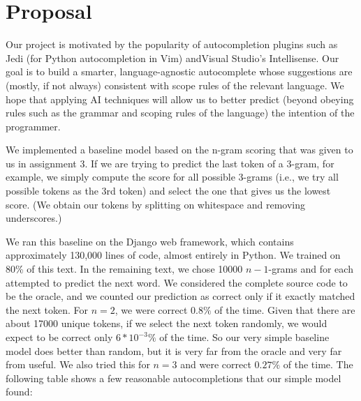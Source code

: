 \documentclass[10.75pt]{article}
\begin{document}
\maketitle

\section{Proposal}
Our project is motivated by the popularity of autocompletion plugins such as Jedi (for Python autocompletion in Vim)\cite{jedi} andVisual Studio's Intellisense. Our goal is to build a smarter, language-agnostic autocomplete whose suggestions are (mostly, if not always) consistent with scope rules of the relevant language. We hope that applying AI techniques will allow us to better predict (beyond obeying rules such as the grammar and scoping rules of the language) the intention of the programmer. 

We implemented a baseline model based on the n-gram scoring that was given to us in assignment 3. If we are trying to predict the last token of a 3-gram, for example, we simply compute the score for all possible 3-grams (i.e., we try all possible tokens as the 3rd token) and select the one that gives us the lowest score. (We obtain our tokens by splitting on whitespace and removing underscores.) 

We ran this baseline on the Django web framework, which contains approximately 130,000 lines of code, almost entirely in Python. We trained on 80\% of this text.  In the remaining text, we chose 10000 $n-1$-grams and for each attempted to predict the next word. We considered the complete source code to be the oracle, and we counted our prediction as correct only if it exactly matched the next token. For $n=2$, we were correct $0.8\%$ of the time.  Given that there are about 17000 unique tokens, if we select the next token randomly, we would expect to be correct only  $6*10^{-3}\%$ of the time. So our very simple baseline model does better than random, but it is very far from the oracle and very far from useful. We also tried this for $n=3$ and were correct $0.27\%$ of the time. The following table shows a few reasonable autocompletions that our simple model found:
\\
\end{document}
